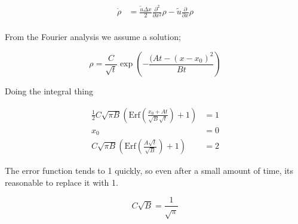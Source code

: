 \documentclass[a4paper]{article}
\begin{document}
\begin{align*}
\dot{\rho} & = \frac{\tilde{u} \Delta x}{2} \frac{\partial ^2}{\partial x ^2} \rho - \tilde{u} \frac{\partial}{\partial x} \rho \\
\end{align*}

From the Fourier analysis we assume a solution; 

\begin{equation}
\rho = \frac{C}{\sqrt{t}} \exp \left( - \frac{(At - (x-x_0)^2}{Bt} \right)
\end{equation}

Doing the integral thing 

\begin{align*}
\frac{1}{2} C \sqrt{\pi B} \left( \text{Erf} \left( \frac{x_0 + At}{\sqrt{B} \sqrt{t}} \right) + 1 \right) & = 1 \\ 
x_0 & = 0 \\
C \sqrt{\pi B} \left( \text{Erf} \left( \frac{A \sqrt{t}}{\sqrt{B}} \right) + 1 \right) & = 2
\end{align*}

The error function tends to 1 quickly, so even after a small amount of time, its reasonable to replace it with 1. 

\begin{equation}
C \sqrt{B} = \frac{1}{\sqrt{\pi}}
\end{equation}
\end{document}
